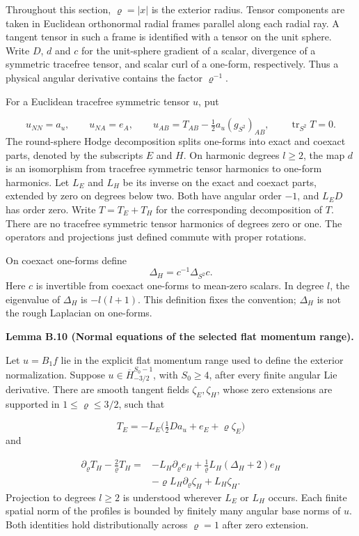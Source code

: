 \documentclass[
  english,
  11pt,
  reqno]{amsart}
\makeatletter
\newcommand{\pandocstatementheading}[1]{%
  \par\addpenalty{\@beginparpenalty}%
  \addvspace{.5\baselineskip plus .2\baselineskip minus .2\baselineskip}%
  {\normalfont\bfseries #1\par}%
  \nobreak\@afterindenttrue\@afterheading
}
\makeatother
\begin{document}
Throughout this section, \(\varrho=|x|\) is the exterior radius. Tensor
components are taken in Euclidean orthonormal radial frames parallel
along each radial ray. A tangent tensor in such a frame is identified
with a tensor on the unit sphere. Write \(D\), \(d\) and \(c\) for the
unit-sphere gradient of a scalar, divergence of a symmetric tracefree
tensor, and scalar curl of a one-form, respectively. Thus a physical
angular derivative contains the factor \(\varrho^{-1}\).

For a Euclidean tracefree symmetric tensor \(u\), put

\label{eq:online-momentum-physical-decomposition} \[
u_{NN}=a_u,\qquad u_{NA}=e_A,\qquad
u_{AB}=T_{AB}-\tfrac12a_u(g_{S^2})_{AB},
\qquad \operatorname{tr}_{S^2}T=0.
\] The round-sphere Hodge decomposition splits one-forms into exact and
coexact parts, denoted by the subscripts \(E\) and \(H\). On harmonic
degrees \(l\ge2\), the map \(d\) is an isomorphism from tracefree
symmetric tensor harmonics to one-form harmonics. Let \(L_E\) and
\(L_H\) be its inverse on the exact and coexact parts, extended by zero
on degrees below two. Both have angular order \(-1\), and \(L_ED\) has
order zero. Write \(T=T_E+T_H\) for the corresponding decomposition of
\(T\). There are no tracefree symmetric tensor harmonics of degrees zero
or one. The operators and projections just defined commute with proper
rotations.

On coexact one-forms define \[
\Delta_H=c^{-1}\Delta_{S^2}c.
\] Here \(c\) is invertible from coexact one-forms to mean-zero scalars.
In degree \(l\), the eigenvalue of \(\Delta_H\) is \(-l(l+1)\). This
definition fixes the convention; \(\Delta_H\) is not the rough Laplacian
on one-forms.

\pandocstatementheading{\leavevmode{}\label{lem:online-momentum-explicit-range-identities}Lemma B.10 (Normal equations of the selected flat momentum range).}

Let \(u=B_1f\) lie in the explicit flat momentum range used to define
the exterior normalization. Suppose \(u\in\overline H^{S_0-1}_{-3/2}\),
with \(S_0\ge4\), after every finite angular Lie derivative. There are
smooth tangent fields \(\zeta_E,\zeta_H\), whose zero extensions are
supported in \(1\le\varrho\le3/2\), such that

\label{eq:online-momentum-electric-range} \[
T_E=-L_E\bigl(\tfrac12Da_u+e_E+\varrho\zeta_E\bigr)
\] and

\label{eq:online-momentum-magnetic-range} \[
\begin{aligned}
\partial_\varrho T_H-\frac2\varrho T_H
={}&-L_H\partial_\varrho e_H
 +\frac1\varrho L_H(\Delta_H+2)e_H\\
&-\varrho L_H\partial_\varrho\zeta_H+L_H\zeta_H.
\end{aligned}
\] Projection to degrees \(l\ge2\) is understood wherever \(L_E\) or
\(L_H\) occurs. Each finite spatial norm of the profiles is bounded by
finitely many angular base norms of \(u\). Both identities hold
distributionally across \(\varrho=1\) after zero extension.
\end{document}
